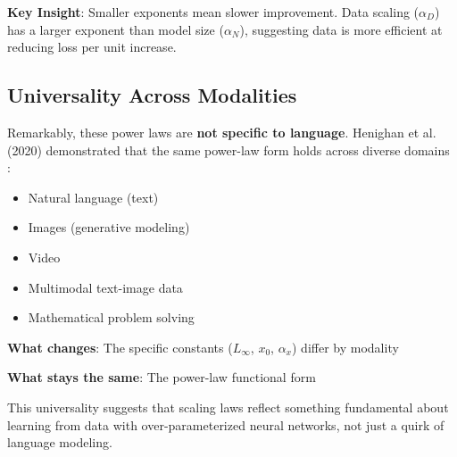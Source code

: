 \documentclass{article}
\begin{document}
\begin{center}
\end{center}

\textbf{Key Insight}: Smaller exponents mean slower improvement. Data scaling ($\alpha_D$) has a larger exponent than model size ($\alpha_N$), suggesting data is more efficient at reducing loss per unit increase.

\subsection{Universality Across Modalities}

Remarkably, these power laws are \textbf{not specific to language}. Henighan et al. (2020) demonstrated that the same power-law form holds across diverse domains \cite{henighan2020scaling}:

\begin{itemize}
\item Natural language (text)
\item Images (generative modeling)
\item Video
\item Multimodal text-image data
\item Mathematical problem solving
\end{itemize}

\textbf{What changes}: The specific constants ($L_{\infty}$, $x_0$, $\alpha_x$) differ by modality

\textbf{What stays the same}: The power-law functional form

This universality suggests that scaling laws reflect something fundamental about learning from data with over-parameterized neural networks, not just a quirk of language modeling.
\end{document}
